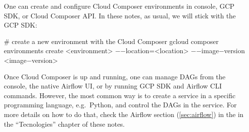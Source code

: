 One can create and configure Cloud Composer environments in console, GCP SDK, or Cloud Composer API. In these notes,
as usual, we will stick with the GCP SDK\@:
\begin{bash}
# create a new environment with the Cloud Composer
gcloud composer environments create <environment>
    $-$$-$location=<location>
    $-$$-$image$-$version <image$-$version>
\end{bash}

Once Cloud Composer is up and running, one can manage DAGs from the console, the native Airflow UI, or by running GCP
SDK and Airflow CLI commands. However, the most common way is to create a service in a specific programming language,
e.g.\ Python, and control the DAGs in the service. For more details on how to do that, check the Airflow section
(\ref{sec:airflow}) in the in the ``Tecnologies'' chapter of these notes.